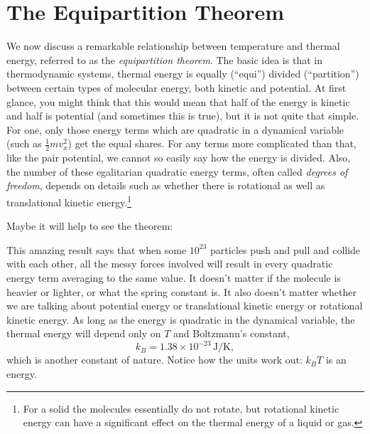 \section{The Equipartition Theorem}
\label{sec:equipartition}

We now discuss a remarkable relationship between temperature and
thermal energy, referred to as the \emph{equipartition theorem}.  The
basic idea is that in thermodynamic systems, thermal energy is equally
(``equi'') divided (``partition'') between certain types of molecular
energy, both kinetic and potential.  At first glance, you might think
that this would mean that half of the energy is kinetic and half is
potential (and sometimes this is true), but it is not quite that simple.
For one, only those energy terms which are quadratic in a
dynamical variable (such as $\frac{1}{2}mv_x^2$) get the equal shares.
For any terms more complicated than that, like the pair potential, we
cannot so easily say how the energy is divided.  Also, the number of these
egalitarian quadratic energy terms, often called \textit{degrees of freedom},
depends on details such as whether there is rotational as well as
translational kinetic energy.\footnote{For a solid the molecules
  essentially do not rotate, but rotational kinetic energy can have a
  significant effect on the thermal energy of a liquid or gas.}



Maybe it will help to see the theorem:


This amazing result says that when some $10^{23}$ particles push and pull
and collide with each other, all the messy forces involved will result in
every quadratic energy term averaging to the same value.   It doesn't
matter if the molecule is heavier or lighter, or what the spring
constant is.  It also doesn't matter whether we are talking about
potential energy or translational kinetic energy or rotational kinetic
energy.  As long as the energy is quadratic in the dynamical variable, 
the thermal energy will depend only on $T$ and
Boltzmann's constant,
\begin{equation}
k_B= 1.38\times 10^{-23}\,\text{J/K},
\end{equation}
which is another constant of nature.  Notice how the units work out:
$k_BT$ is an energy.


